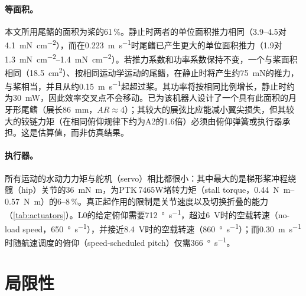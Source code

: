 \paragraph{等面积。}本文所用尾鳍的面积为桨的61\,\%。静止时两者的单位面积推力相同（\SIrange{3.9}{4.5}{}对\SI{4.1}{\milli\newton\per\square\centi\metre}），而在\SI{0.223}{\metre\per\second}时尾鳍已产生更大的单位面积推力（\SI{1.9}{}对\SIrange{1.3}{1.4}{\milli\newton\per\square\centi\metre}）。若推力系数和功率系数保持不变，一个与桨面积相同（\SI{18.5}{\square\centi\metre}）、按相同运动学运动的尾鳍，在静止时将产生约\SI{75}{\milli\newton}的推力，与桨相当，并且从约\SI{0.15}{\metre\per\second}起超过桨。其功率将按相同比例增长，静止时约为\SI{30}{\milli\watt}，因此效率交叉点不会移动。已为该机器人设计了一个具有此面积的月牙形尾鳍（展长\SI{86}{\milli\metre}，$\mathit{AR}\approx4$）；其较大的展弦比应能减小翼尖损失，但其较大的铰链力矩（在相同俯仰规律下约为A2的1.6倍）必须由俯仰弹簧或执行器承担。这是估算值，而非仿真结果。

\paragraph{执行器。}所有运动的水动力力矩与舵机（servo）相比都很小：其中最大的是梯形桨冲程绕髋（hip）关节的\SI{36}{\milli\newton\metre}，为PTK\,7465W堵转力矩（stall torque，\SIrange{0.44}{0.57}{\newton\metre}）的6--8\,\%。真正起作用的限制是关节速度以及切换折叠的能力（\cref{tab:actuators}）。L0的给定俯仰需要\SI{712}{\degree\per\second}，超过\SI{6}{\volt}时的空载转速（no-load speed，\SI{650}{\degree\per\second}），并接近\SI{8.4}{\volt}时的空载转速（\SI{860}{\degree\per\second}）；而\SI{0.30}{\metre\per\second}时随航速调度的俯仰（speed-scheduled pitch）仅需\SI{366}{\degree\per\second}。

\section{局限性}
\label{sec:disc-limits}

